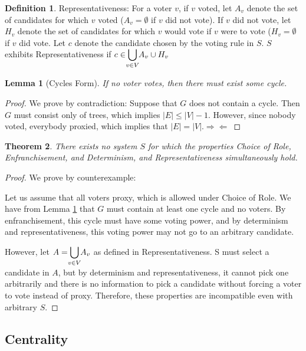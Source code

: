 \documentclass[10pt]{article}
\newtheorem{theorem}{Theorem}[section]
\newtheorem{lemma}[theorem]{Lemma}
\theoremstyle{definition}
\newtheorem{definition}{Definition}[section]
\begin{document}
\theoremstyle{definition}
\begin{definition}{Representativeness:}
For a voter $v$, if $v$ voted, let $A_v$ denote the set of candidates for which $v$ voted ($A_v = \emptyset$ if $v$ did not vote). If $v$ did not vote, let $H_v$ denote the set of candidates for which $v$ would vote if $v$ were to vote ($H_v = \emptyset$ if $v$ did vote.  Let $c$ denote the candidate chosen by the voting rule in $S$. $S$ exhibits Representativeness if $c \in \smashoperator{\bigcup\limits_{v \in V}}A_v\cup H_v$ 
\end{definition}

\begin{lemma}[Cycles Form]
\label{cyclesform}
If no voter votes, then there must exist some cycle.
\end{lemma}
\begin{proof}
We prove by contradiction:
Suppose that $G$ does not contain a cycle. Then $G$ must consist only of trees, which implies $|E| \leq |V| -1$. However, since nobody voted, everybody proxied, which implies that $|E| = |V|. \Rightarrow\Leftarrow$
\end{proof}

\begin{theorem} 
\label{CFLIT}
There exists no system $S$ for which the properties Choice of Role, Enfranchisement, and Determinism, and Representativeness simultaneously hold.
\end{theorem}
\begin{proof} We prove by counterexample:

Let us assume that all voters proxy, which is allowed under Choice of Role. We have from Lemma \ref{cyclesform} that $G$ must contain at least one cycle and no voters. By enfranchisement, this cycle must have some voting power, and by determinism and representativeness, this voting power may not go to an arbitrary candidate. 

However, let $A = \smashoperator{\bigcup\limits_{v \in V}}A_v$ as defined in Representativeness. S must select a candidate in $A$, but by determinism and representativeness, it cannot pick one arbitrarily and there is no information to pick a candidate without forcing a voter to vote instead of proxy. Therefore, these properties are incompatible even with arbitrary $S$.

\end{proof}

\subsection{Centrality}
\end{document}
